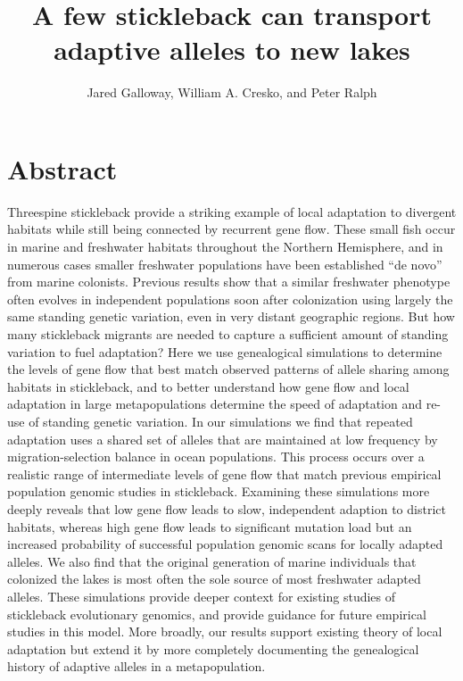 \documentclass{article}
\begin{document}
\title{A few stickleback can transport adaptive alleles to new lakes}
\author{Jared Galloway, William A. Cresko, and Peter Ralph}
\maketitle

\section*{Abstract}

Threespine stickleback provide a striking example of local adaptation to divergent habitats while still being connected by recurrent gene flow. These small fish occur in marine and freshwater habitats throughout the Northern Hemisphere, and in numerous cases smaller freshwater populations have been established ``de novo'' from marine colonists. Previous results show that a similar freshwater phenotype often evolves in independent populations soon after colonization using largely the same standing genetic variation, even in very distant geographic regions. But how many stickleback migrants are needed to capture a sufficient amount of standing variation to fuel adaptation? Here we use genealogical simulations to determine the levels of gene flow that best match observed patterns of allele sharing among habitats in stickleback, and to better understand how gene flow and local adaptation in large metapopulations determine the speed of adaptation and re-use of standing genetic variation. In our simulations we find that repeated adaptation uses a shared set of alleles that are maintained at low frequency by migration-selection balance in ocean populations. This process occurs over a realistic range of intermediate levels of gene flow that match previous empirical population genomic studies in stickleback. Examining these simulations more deeply reveals that low gene flow leads to slow, independent adaption to district habitats, whereas high gene flow leads to significant mutation load but an increased probability of successful population genomic scans for locally adapted alleles. We also find that the original generation of marine individuals that colonized the lakes is most often the sole source of most freshwater adapted alleles. These simulations provide deeper context for existing studies of stickleback evolutionary genomics, and provide guidance for future empirical studies in this model. More broadly, our results support existing theory of local adaptation but extend it by more completely documenting the genealogical history of adaptive alleles in a metapopulation.  
\end{document}
